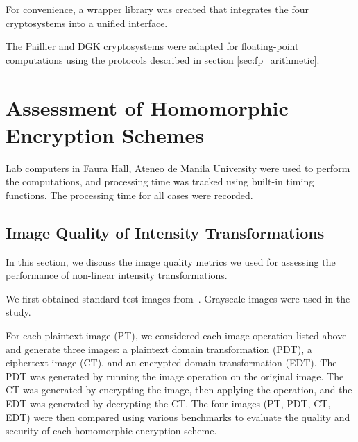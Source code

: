 For convenience, a wrapper library was created that integrates the four cryptosystems into a unified interface.

The Paillier and DGK cryptosystems were adapted for floating-point computations using the protocols described in section \ref{sec:fp_arithmetic}.



\section{Assessment of Homomorphic Encryption Schemes}

Lab computers in Faura Hall, Ateneo de Manila University were used to perform the computations, and processing time was tracked using built-in timing functions. The processing time for all cases were recorded.

\subsection{Image Quality of Intensity Transformations}
In this section, we discuss the image quality metrics we used for assessing the performance of non-linear intensity transformations.

We first obtained standard test images from~\cite{gonzalez_image_nodate}. Grayscale images were used in the study.

For each plaintext image (PT), we considered each image operation listed above and generate three images: a plaintext domain transformation (PDT), a ciphertext image (CT), and an encrypted domain transformation (EDT). The PDT was generated by running the image operation on the original image. The CT was generated by encrypting the image, then applying the operation, and the EDT was generated by decrypting the CT. The four images (PT, PDT, CT, EDT) were then compared using various benchmarks to evaluate the quality and security of each homomorphic encryption scheme.

